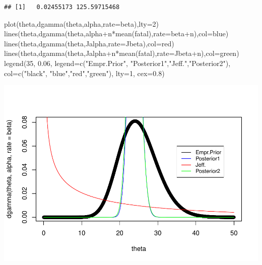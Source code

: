 \documentclass[
]{book}
\newenvironment{Shaded}{\begin{snugshade}}{\end{snugshade}}
\newcommand{\AttributeTok}[1]{\textcolor[rgb]{0.77,0.63,0.00}{#1}}
\newcommand{\DecValTok}[1]{\textcolor[rgb]{0.00,0.00,0.81}{#1}}
\newcommand{\FloatTok}[1]{\textcolor[rgb]{0.00,0.00,0.81}{#1}}
\newcommand{\FunctionTok}[1]{\textcolor[rgb]{0.00,0.00,0.00}{#1}}
\newcommand{\NormalTok}[1]{#1}
\newcommand{\SpecialCharTok}[1]{\textcolor[rgb]{0.00,0.00,0.00}{#1}}
\newcommand{\StringTok}[1]{\textcolor[rgb]{0.31,0.60,0.02}{#1}}
\theoremstyle{definition}
\theoremstyle{definition}
\theoremstyle{definition}
\theoremstyle{definition}
\theoremstyle{remark}
\begin{document}
\begin{verbatim}
## [1]   0.02455173 125.59715468
\end{verbatim}

\begin{Shaded}
\begin{Highlighting}[]
 \FunctionTok{plot}\NormalTok{(theta,}\FunctionTok{dgamma}\NormalTok{(theta,alpha,}\AttributeTok{rate=}\NormalTok{beta),}\AttributeTok{lty=}\DecValTok{2}\NormalTok{)}
\FunctionTok{lines}\NormalTok{(theta,}\FunctionTok{dgamma}\NormalTok{(theta,alpha}\SpecialCharTok{+}\NormalTok{n}\SpecialCharTok{*}\FunctionTok{mean}\NormalTok{(fatal),}\AttributeTok{rate=}\NormalTok{beta}\SpecialCharTok{+}\NormalTok{n),}\AttributeTok{col=}\StringTok{\textquotesingle{}blue\textquotesingle{}}\NormalTok{)}
\FunctionTok{lines}\NormalTok{(theta,}\FunctionTok{dgamma}\NormalTok{(theta,Jalpha,}\AttributeTok{rate=}\NormalTok{Jbeta),}\AttributeTok{col=}\StringTok{\textquotesingle{}red\textquotesingle{}}\NormalTok{)}
\FunctionTok{lines}\NormalTok{(theta,}\FunctionTok{dgamma}\NormalTok{(theta,Jalpha}\SpecialCharTok{+}\NormalTok{n}\SpecialCharTok{*}\FunctionTok{mean}\NormalTok{(fatal),}\AttributeTok{rate=}\NormalTok{Jbeta}\SpecialCharTok{+}\NormalTok{n),}\AttributeTok{col=}\StringTok{\textquotesingle{}green\textquotesingle{}}\NormalTok{)}
\FunctionTok{legend}\NormalTok{(}\DecValTok{35}\NormalTok{, }\FloatTok{0.06}\NormalTok{, }\AttributeTok{legend=}\FunctionTok{c}\NormalTok{(}\StringTok{"Empr.Prior"}\NormalTok{, }\StringTok{"Posterior1"}\NormalTok{,}\StringTok{"Jeff."}\NormalTok{,}\StringTok{"Posterior2"}\NormalTok{),}
       \AttributeTok{col=}\FunctionTok{c}\NormalTok{(}\StringTok{"black"}\NormalTok{, }\StringTok{"blue"}\NormalTok{,}\StringTok{"red"}\NormalTok{,}\StringTok{"green"}\NormalTok{), }\AttributeTok{lty=}\DecValTok{1}\NormalTok{, }\AttributeTok{cex=}\FloatTok{0.8}\NormalTok{)}
\end{Highlighting}
\end{Shaded}

\includegraphics{_main_files/figure-latex/unnamed-chunk-23-1.pdf}
\end{document}
